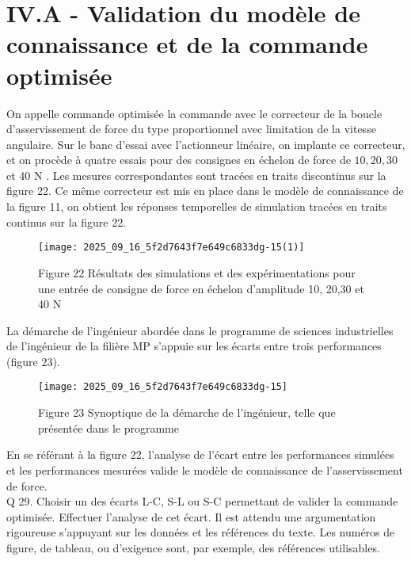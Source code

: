 \section{IV.A - Validation du modèle de connaissance et de la commande optimisée}
On appelle commande optimisée la commande avec le correcteur de la boucle d'asservissement de force du type proportionnel avec limitation de la vitesse angulaire. Sur le banc d'essai avec l'actionneur linéaire, on implante ce correcteur, et on procède à quatre essais pour des consignes en échelon de force de $10,20,30$ et 40 N . Les mesures correspondantes sont tracées en traits discontinus sur la figure 22. Ce même correcteur est mis en place dans le modèle de connaissance de la figure 11, on obtient les réponses temporelles de simulation tracées en traits continus sur la figure 22.

\begin{figure}[h]
\begin{center}
  \texttt{[image: 2025\_09\_16\_5f2d7643f7e649c6833dg-15(1)]}
\captionsetup{labelformat=empty}
\caption{Figure 22 Résultats des simulations et des expérimentations pour une entrée de consigne de force en échelon d'amplitude 10, 20,30 et 40 N}
\end{center}
\end{figure}

La démarche de l'ingénieur abordée dans le programme de sciences industrielles de l'ingénieur de la filière MP s'appuie sur les écarts entre trois performances (figure 23).

\begin{figure}[h]
\begin{center}
  \texttt{[image: 2025\_09\_16\_5f2d7643f7e649c6833dg-15]}
\captionsetup{labelformat=empty}
\caption{Figure 23 Synoptique de la démarche de l'ingénieur, telle que présentée dans le programme}
\end{center}
\end{figure}

En se référant à la figure 22, l'analyse de l'écart entre les performances simulées et les performances mesurées valide le modèle de connaissance de l'asservissement de force.\\
Q 29. Choisir un des écarts L-C, S-L ou S-C permettant de valider la commande optimisée. Effectuer l'analyse de cet écart. Il est attendu une argumentation rigoureuse s'appuyant sur les données et les références du texte. Les numéros de figure, de tableau, ou d'exigence sont, par exemple, des références utilisables.

